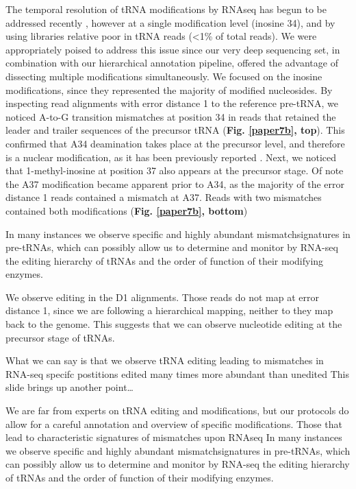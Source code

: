 \documentclass[12pt]{rockefeller}
\begin{document}
The temporal resolution of tRNA modifications by RNAseq has begun to be addressed recently  \cite{Torres:2015ed}, however at a single modification level (inosine 34), and by using libraries relative poor in tRNA reads (<1\% of total reads). We were appropriately poised to address this issue since our very deep sequencing set, in combination with our hierarchical annotation pipeline, offered the advantage of dissecting multiple modifications simultaneously. We focused on the inosine modifications, since they represented the majority of modified nucleosides. By inspecting read alignments with error distance 1 to the reference pre-tRNA, we noticed A-to-G transition mismatches at position 34 in reads that retained the leader and trailer sequences of the precursor tRNA (\textbf{Fig. \ref{paper7b}, top}). 
This confirmed that A34 deamination takes place at the precursor level, and therefore is a nuclear modification, as it has been previously reported \cite{Torres:2015ed}. 
Next, we noticed that 1-methyl-inosine at position 37 also appears at the precursor stage. Of note the A37 modification became apparent prior to A34, as the majority of the error distance 1 reads contained a mismatch at A37. Reads with two mismatches contained both modifications (\textbf{Fig. \ref{paper7b}, bottom})

In many instances we observe specific and highly abundant mismatchsignatures in pre-tRNAs, which can possibly allow us to determine and monitor by RNA-seq the editing hierarchy of tRNAs and the order of function of their modifying enzymes. 

We observe editing in the D1 alignments. Those reads do not map at error distance 1, since we are following a hierarchical mapping, neither to they map back to the genome. This suggests that we can observe nucleotide editing at the precursor stage of tRNAs. 
 

What we can say is that 
	we observe tRNA editing leading to mismatches in RNA-seq
	specifc postitions 
	edited many times more abundant than unedited
This slide brings up another point…

We are far from experts on tRNA editing and modifications, but our protocols do allow for a careful annotation and overview of specific modifications. Those that lead to characteristic signatures of mismatches upon RNAseq
In many instances we observe specific and highly abundant mismatchsignatures in pre-tRNAs, which can possibly allow us to determine and monitor by RNA-seq the editing hierarchy of tRNAs and the order of function of their modifying enzymes. 
\end{document}
